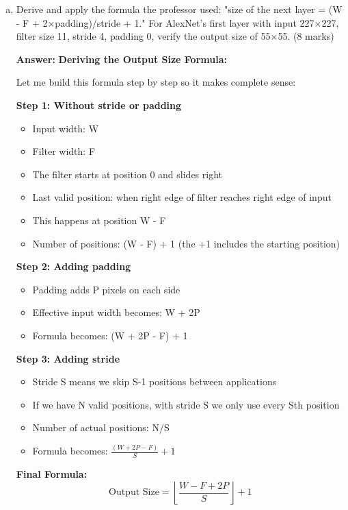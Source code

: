 \documentclass[12pt]{article}
\newcommand{\answer}[1]{{\color{answercolor}\textbf{Answer:} #1}}
\newcommand{\explanation}[1]{{\color{explanationcolor}#1}}
\begin{document}
\begin{enumerate}[(a)]
    \item Derive and apply the formula the professor used: "size of the next layer = (W - F + 2×padding)/stride + 1." For AlexNet's first layer with input 227×227, filter size 11, stride 4, padding 0, verify the output size of 55×55. \hfill (8 marks)
    
    \answer{
    \textbf{Deriving the Output Size Formula:}
    
    \explanation{
    Let me build this formula step by step so it makes complete sense:
    
    \textbf{Step 1: Without stride or padding}
    \begin{itemize}
        \item Input width: W
        \item Filter width: F
        \item The filter starts at position 0 and slides right
        \item Last valid position: when right edge of filter reaches right edge of input
        \item This happens at position W - F
        \item Number of positions: (W - F) + 1 (the +1 includes the starting position)
    \end{itemize}
    
    \textbf{Step 2: Adding padding}
    \begin{itemize}
        \item Padding adds P pixels on each side
        \item Effective input width becomes: W + 2P
        \item Formula becomes: (W + 2P - F) + 1
    \end{itemize}
    
    \textbf{Step 3: Adding stride}
    \begin{itemize}
        \item Stride S means we skip S-1 positions between applications
        \item If we have N valid positions, with stride S we only use every Sth position
        \item Number of actual positions: N/S
        \item Formula becomes: $\frac{(W + 2P - F)}{S} + 1$
    \end{itemize}
    }
    
    \textbf{Final Formula:}
    \[\text{Output Size} = \left\lfloor\frac{W - F + 2P}{S}\right\rfloor + 1\]
    
}
\end{enumerate}
\end{document}
